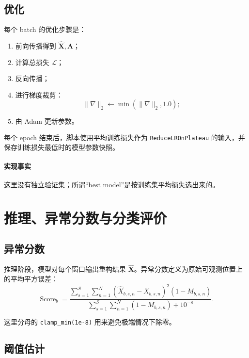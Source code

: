 \documentclass[UTF8]{ctexart}
\begin{document}
\subsection{优化}

每个 batch 的优化步骤是：
\begin{enumerate}
    \item 前向传播得到 $\hat{\bm{X}}, \bm{A}$；
    \item 计算总损失 $\mathcal{L}$；
    \item 反向传播；
    \item 进行梯度裁剪：
    \begin{equation}
        \|\nabla\|_2 \leftarrow \min(\|\nabla\|_2, 1.0);
    \end{equation}
    \item 由 Adam 更新参数。
\end{enumerate}

每个 epoch 结束后，脚本使用平均训练损失作为 \texttt{ReduceLROnPlateau} 的输入，并保存训练损失最低时的模型参数快照。

\paragraph{实现事实}
这里没有独立验证集；所谓“best model”是按训练集平均损失选出来的。

\section{推理、异常分数与分类评价}

\subsection{异常分数}

推理阶段，模型对每个窗口输出重构结果 $\hat{\bm{X}}$。异常分数定义为原始可观测位置上的平均平方误差：
\begin{equation}
    \operatorname{Score}_b
    =
    \frac{
        \sum_{s=1}^{S}\sum_{n=1}^{N}
        (\hat{X}_{b,s,n} - X_{b,s,n})^2 (1-M_{b,s,n})
    }{
        \sum_{s=1}^{S}\sum_{n=1}^{N}(1-M_{b,s,n}) + 10^{-8}
    }.
\end{equation}

这里分母的 \texttt{clamp\_min(1e-8)} 用来避免极端情况下除零。

\subsection{阈值估计}
\end{document}
